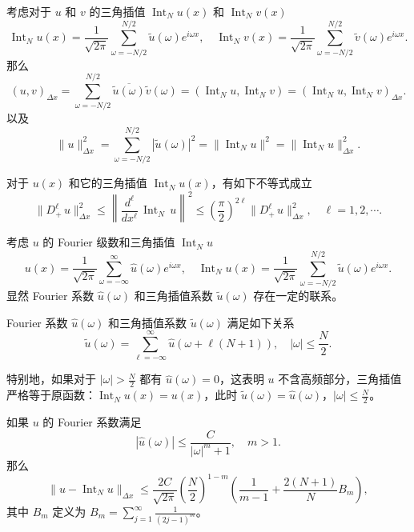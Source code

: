 \begin{theorem}
    考虑对于 $u$ 和 $v$ 的三角插值 $\operatorname{Int}_N u(x)$ 和 $\operatorname{Int}_N v(x)$
    \[
        \operatorname{Int}_N u(x) = \frac{1}{\sqrt{2\pi}} \sum_{\omega = -N/2}^{N/2} \widetilde{u}(\omega) e^{i \omega x},\quad
        \operatorname{Int}_N v(x) = \frac{1}{\sqrt{2\pi}} \sum_{\omega = -N/2}^{N/2} \widetilde{v}(\omega) e^{i \omega x}.
    \]
    那么
    \[
        (u,v)_{\Delta x} = \sum_{\omega = -N/2}^{N/2} \overline{\widetilde{u}(\omega)} \widetilde{v}(\omega) = (\operatorname{Int}_N u,\operatorname{Int}_N v) = (\operatorname{Int}_N u,\operatorname{Int}_N v)_{\Delta x}.
    \]
    以及
    \[
        \|u\|_{\Delta x}^2 = \sum_{\omega = -N/2}^{N/2} |\widetilde{u}(\omega)|^2 = \|\operatorname{Int}_N u\|^2 = \|\operatorname{Int}_N u\|_{\Delta x}^2.
    \]
\end{theorem}


\begin{theorem}
    对于 $u(x)$ 和它的三角插值 $\operatorname{Int}_N u(x)$，有如下不等式成立
    \[
        \| D^\ell_+\,u\|_{\Delta x}^2 \le
        \left\| \frac{d^\ell}{dx^\ell}\,\operatorname{Int}_N \,u\right\|^2 \le
        \left(\frac{\pi}2\right)^{2\ell} \|D^\ell_+\,u\|_{\Delta x}^2,\quad \ell=1,2,\cdots.
    \]
\end{theorem}

考虑 $u$ 的 Fourier 级数和三角插值 $\operatorname{Int}_N u$
\[
    u(x) = \frac{1}{\sqrt{2\pi}} \sum_{\omega = -\infty}^\infty \widehat{u}(\omega) e^{i \omega x},\quad
    \operatorname{Int}_N u(x) = \frac{1}{\sqrt{2\pi}} \sum_{\omega = -N/2}^{N/2} \widetilde{u}(\omega) e^{i \omega x}.
\]
显然 Fourier 系数 $\widehat{u}(\omega)$ 和三角插值系数 $\widetilde{u}(\omega)$ 存在一定的联系。

\begin{lemma}
    Fourier 系数 $\widehat{u}(\omega)$ 和三角插值系数 $\widetilde{u}(\omega)$ 满足如下关系
    \[
        \widetilde{u}(\omega) = \sum_{\ell = -\infty}^\infty \widehat{u}(\omega + \ell(N+1)),\quad |\omega| \le \frac{N}2.
    \]
\end{lemma}

特别地，如果对于 $|\omega| > \frac{N}2$ 都有 $\widehat{u}(\omega) = 0$，这表明 $u$ 不含高频部分，三角插值严格等于原函数：$\operatorname{Int}_N u(x) = u(x)$，此时 $\widetilde{u}(\omega) = \widehat{u}(\omega)$，$|\omega| \le \frac{N}2$。

\begin{theorem}
    如果 $u$ 的 Fourier 系数满足
    \[
        |\widehat{u}(\omega)| \le \frac{C}{|\omega|^m+1},\quad m > 1.
    \]
    那么
    \[
        \|u - \operatorname{Int}_N u\|_{\Delta x} \le \frac{2C}{\sqrt{2\pi}}
        \left(\frac{N}2\right)^{1-m}
        \left(
        \frac{1}{m-1} + \frac{2(N+1)}N B_m
        \right),
    \]
    其中 $B_m$ 定义为 $B_m = \sum_{j = 1}^\infty \frac{1}{(2j-1)^m}$。
\end{theorem}

